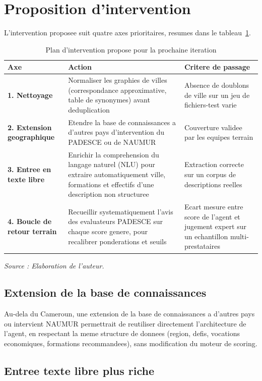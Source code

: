 \documentclass[12pt,a4paper,twoside,openany]{report}
\begin{document}
\section{Proposition d'intervention}

L'intervention proposee suit quatre axes prioritaires, resumes dans le tableau~\ref{tab:intervention}.

\begin{table}[H]
\centering
\caption{Plan d'intervention propose pour la prochaine iteration}
\label{tab:intervention}
\begin{tabularx}{\textwidth}{>{\bfseries}l X X}
\toprule
Axe & Action & Critere de passage \\
\midrule
1. Nettoyage & Normaliser les graphies de villes (correspondance approximative, table de synonymes) avant deduplication & Absence de doublons de ville sur un jeu de fichiers-test varie \\
2. Extension geographique & Etendre la base de connaissances a d'autres pays d'intervention du PADESCE ou de NAUMUR & Couverture validee par les equipes terrain \\
3. Entree en texte libre & Enrichir la comprehension du langage naturel (NLU) pour extraire automatiquement ville, formations et effectifs d'une description non structuree & Extraction correcte sur un corpus de descriptions reelles \\
4. Boucle de retour terrain & Recueillir systematiquement l'avis des evaluateurs PADESCE sur chaque score genere, pour recalibrer ponderations et seuils & Ecart mesure entre score de l'agent et jugement expert sur un echantillon multi-prestataires \\
\bottomrule
\end{tabularx}
\textit{Source : Elaboration de l'auteur.}
\end{table}

\subsection{Extension de la base de connaissances}

Au-dela du Cameroun, une extension de la base de connaissances a d'autres pays ou intervient NAUMUR permettrait de reutiliser directement l'architecture de l'agent, en respectant la meme structure de donnees (region, defis, vocations economiques, formations recommandees), sans modification du moteur de scoring.

\subsection{Entree texte libre plus riche}
\end{document}
